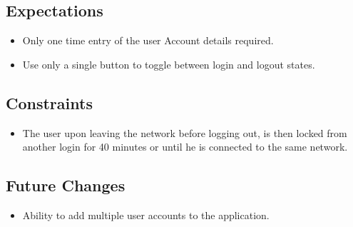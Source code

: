 \documentclass{article}
\begin{document}
\subsection{Expectations}
\begin{itemize}
    \item Only one time entry of the user Account details required.
    \item Use only a single button to toggle between login and logout states.
\end{itemize}

\subsection{Constraints}
\begin{itemize}
    \item The user upon leaving the network before logging out, is then locked from another login for 40 minutes or until he is connected to the same network. 
\end{itemize}

\subsection{Future Changes}
\begin{itemize}
    \item Ability to add multiple user accounts to the application.
\end{itemize}
\end{document}

